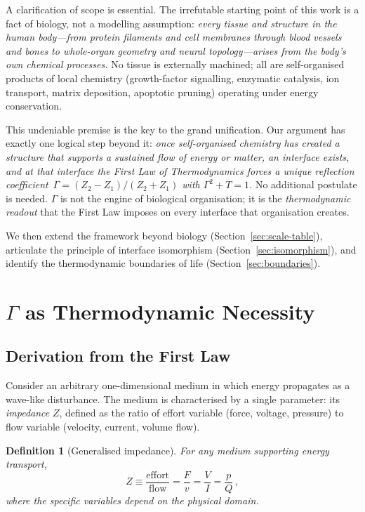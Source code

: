 \documentclass[aps,pre,twocolumn,superscriptaddress,floatfix]{revtex4-2}
\newtheorem{definition}{Definition}
\begin{document}
A clarification of scope is essential.
The irrefutable starting point of this work is a fact of
biology, not a modelling assumption:
\emph{every tissue and structure in the human body---from
protein filaments and cell membranes through blood vessels
and bones to whole-organ geometry and neural
topology---arises from the body's own chemical processes.}
No tissue is externally machined; all are self-organised
products of local chemistry (growth-factor signalling,
enzymatic catalysis, ion transport, matrix deposition,
apoptotic pruning) operating under energy conservation.

This undeniable premise is the key to the grand unification.
Our argument has exactly one logical step beyond it:
\emph{once self-organised chemistry has created a structure
that supports a sustained flow of energy or matter,
an interface exists, and at that interface the First Law
of Thermodynamics forces a unique reflection
coefficient~$\Gamma=(Z_2-Z_1)/(Z_2+Z_1)$ with
$\Gamma^2+T=1$.}
No additional postulate is needed.
$\Gamma$ is not the engine of biological organisation;
it is the \emph{thermodynamic readout} that the First Law
imposes on every interface that organisation creates.

We then extend the framework beyond biology
(Section~\ref{sec:scale-table}),
articulate the principle of interface isomorphism
(Section~\ref{sec:isomorphism}),
and identify the thermodynamic boundaries of life
(Section~\ref{sec:boundaries}).


\section{$\Gamma$ as Thermodynamic Necessity}
\label{sec:necessity}

\subsection{Derivation from the First Law}

Consider an arbitrary one-dimensional medium in which
energy propagates as a wave-like disturbance.
The medium is characterised by a single parameter: its
\emph{impedance} $Z$, defined as the ratio of effort variable
(force, voltage, pressure) to flow variable (velocity, current,
volume flow).

\begin{definition}[Generalised impedance]
For any medium supporting energy transport,
\begin{equation}
  Z \equiv \frac{\text{effort}}{\text{flow}}
  = \frac{F}{v} = \frac{V}{I} = \frac{p}{Q}\,,
  \label{eq:Z-def}
\end{equation}
where the specific variables depend on the physical domain.
\end{definition}
\end{document}
